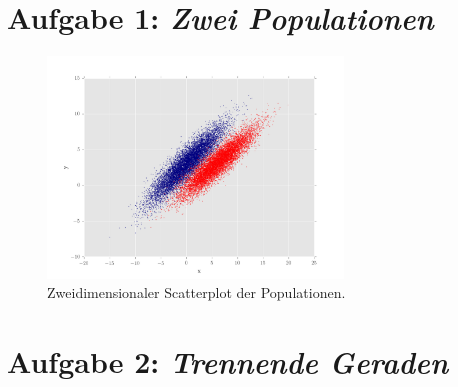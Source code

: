  

\section*{Aufgabe 1: \emph{Zwei Populationen}}


\begin{figure}
	\centering
	\includegraphics[width=0.7\textwidth]{1b.png}
	\caption{Zweidimensionaler Scatterplot der Populationen.}
\end{figure}


\section*{Aufgabe 2: \emph{Trennende Geraden}}

